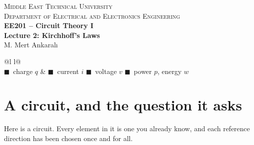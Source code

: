\documentclass[11pt,a4paper]{article}
\newcommand{\Icol}[1]{\textcolor{ccur}{#1}}
\newcommand{\Vcol}[1]{\textcolor{cvolt}{#1}}
\newcommand{\Pcol}[1]{\textcolor{cpow}{#1}}
\newcommand{\Qcol}[1]{\textcolor{ccharge}{#1}}
\begin{document}
\begin{center}
\begin{tcolorbox}[enhanced, colback=metured!5, colframe=metured, boxrule=1pt,
                  arc=3pt, left=10pt,right=10pt,top=7pt,bottom=7pt, width=\textwidth]
\begin{center}
  {\small\scshape Middle East Technical University}\\[2pt]
  {\small\scshape Department of Electrical and Electronics Engineering}\\[7pt]
  {\Large\bfseries\color{metured} EE201 -- Circuit Theory I}\\[4pt]
  {\large\bfseries Lecture 2: Kirchhoff's Laws}\\[6pt]
  {\small M. Mert Ankaralı}
\end{center}
\end{tcolorbox}
\end{center}
\vspace{-0.5em}

\begin{center}
\small
\begin{tabular}{@{}l l@{}}
\toprule
{}\\
\midrule
\Qcol{$\blacksquare$}~charge $q$ & \Icol{$\blacksquare$}~current $i$ \quad
\Vcol{$\blacksquare$}~voltage $v$ \quad \Pcol{$\blacksquare$}~power $p$, energy $w$\\
\bottomrule
\end{tabular}
\end{center}

\section{A circuit, and the question it asks}

Here is a circuit. Every element in it is one you already know, and each reference
direction has been chosen once and for all.
\end{document}
